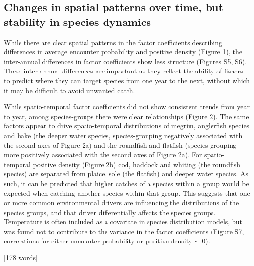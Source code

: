 \documentclass{nature}
\begin{document}
\begin{linenumbers}
[617 words]

\subsection{Changes in spatial patterns over time, but stability in species
	dynamics}

While there are clear spatial patterns in the factor coefficients describing
differences in average encounter probability and positive density (Figure 1),
the inter-annual differences in factor coefficients show less structure
(Figures S5, S6). These inter-annual differences are important as they reflect
the ability of fishers to predict where they can target species from one year
to the next, without which it may be difficult to avoid unwanted catch.

While spatio-temporal factor coefficients did not show consistent trends from
year to year, among species-groups there were clear relationships (Figure 2).
The same factors appear to drive spatio-temporal distributions of megrim,
anglerfish species and hake (the deeper water species, species-grouping
negatively associated with the second axes of Figure 2a) and the roundfish and
flatfish (species-grouping more positively associated with the second axes of
Figure 2a). For spatio-temporal positive density (Figure 2b) cod, haddock and
whiting (the roundfish species) are separated from plaice, sole (the flatfish)
and deeper water species. As such, it can be predicted that higher catches of a
species within a group would be expected when catching another species within
that group. This suggests that one or more common environmental drivers are
influencing the distributions of the species groups, and that driver
differentially affects the species groups. Temperature is often included as a
covariate in species distribution models, but was found not to contribute to
the variance in the factor coefficients (Figure S7, correlations for either
encounter probability or positive density $\sim$ 0).

[178 words]


\end{linenumbers}
\end{document}
